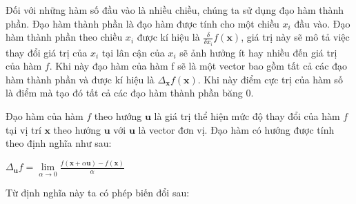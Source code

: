 \documentclass[fontsize=12pt]{scrartcl}
\begin{document}
\par
Đối với những hàm số đầu vào là nhiều chiều, chúng ta sử dụng đạo hàm thành phần. Đạo hàm thành phần là đạo hàm được tính cho một chiều $x_i$ đầu vào. Đạo hàm thành phần theo chiều $x_i$ được kí hiệu là $\frac{\delta}{\delta x_i}f(\boldsymbol{x})$, giá trị này sẽ mô tả việc thay đổi giá trị của $x_i$ tại lân cận của $x_i$ sẽ ảnh hưởng ít hay nhiều đến giá trị của hàm $f$. Khi này đạo hàm của hàm f sẽ là một vector bao gồm tất cả các đạo hàm thành phần và được kí hiệu là $\Delta_{\boldsymbol{x}}f(\boldsymbol{x})$. Khi này điểm cực trị của hàm số là điểm mà tạo đó tất cả các đạo hàm thành phần băng 0.
\par
Đạo hàm của hàm $f$ theo hướng $\boldsymbol{u}$ là giá trị thể hiện mức độ thay đổi của hàm $f$ tại vị trí $\boldsymbol{x}$ theo hướng $\boldsymbol{u}$ với $\boldsymbol{u}$ là vector đơn vị.
Đạo hàm có hướng được tính theo định nghĩa như sau:\\
\begin{center}
$\Delta_{\boldsymbol{u}} f = \lim\limits_{\alpha\rightarrow 0}\frac{f(\boldsymbol{x}+\alpha \boldsymbol{u}) - f(\boldsymbol{x})}{\alpha}$
\end{center}
\par
Từ định nghĩa này ta có phép biến đổi sau:
 
\end{document}
